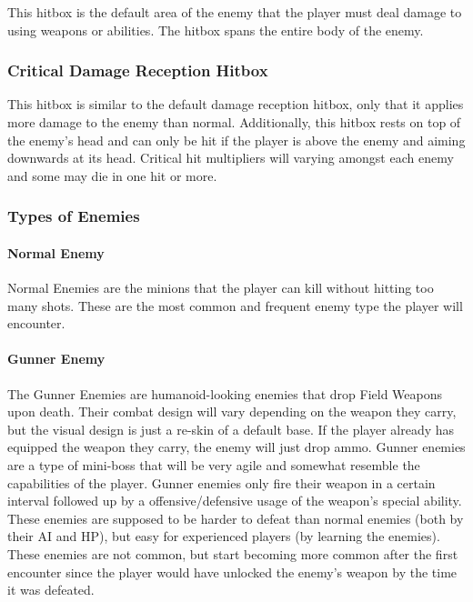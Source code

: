 \documentclass[12pt]{article}
\begin{document}
This hitbox is the default area of the enemy that the player must deal damage to using weapons or abilities. The hitbox spans the entire body of the enemy.

\subsubsection{Critical Damage Reception Hitbox}

This hitbox is similar to the default damage reception hitbox, only that it applies more damage to the enemy than normal. Additionally, this hitbox rests on top of the enemy's head and can only be hit if the player is above the enemy and aiming downwards at its head. Critical hit multipliers will varying amongst each enemy and some may die in one hit or more. 

\subsubsection{Types of Enemies}

\paragraph{Normal Enemy}

Normal Enemies are the minions that the player can kill without hitting too many shots. These are the most common and frequent enemy type the player will encounter. 

\paragraph{Gunner Enemy}

The Gunner Enemies are humanoid-looking enemies that drop Field Weapons upon death. Their combat design will vary depending on the weapon they carry, but the visual design is just a re-skin of a default base. If the player already has equipped the weapon they carry, the enemy will just drop ammo. Gunner enemies are a type of mini-boss that will be very agile and somewhat resemble the capabilities of the player. Gunner enemies only fire their weapon in a certain interval followed up by a offensive/defensive usage of the weapon's special ability. These enemies are supposed to be harder to defeat than normal enemies (both by their AI and HP), but easy for experienced players (by learning the enemies). These enemies are not common, but start becoming more common after the first encounter since the player would have unlocked the enemy's weapon by the time it was defeated. 
\end{document}
